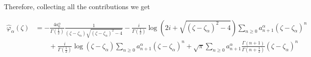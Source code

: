 \documentclass{article}
\begin{document}
Therefore, collecting all the contributions we get

\begin{align*}
\hat{\varphi}_{\alpha}(\zeta)&=-\frac{4a_0^{\alpha}}{\Gamma\left(\tfrac{1}{2}\right)}\frac{1}{(\zeta-\zeta_\alpha)\sqrt{(\zeta-\zeta_{\alpha})^2-4}}-\frac{i}{\Gamma\left(\tfrac{1}{2}\right)}\log(2i+\sqrt{(\zeta-\zeta_\alpha)^2-4})\sum_{n\geq 0}a_{n+1}^{\alpha}(\zeta-\zeta_{\alpha})^{n}\\
&\qquad +\frac{i}{\Gamma\left(\tfrac{1}{2}\right)}\log(\zeta-\zeta_{\alpha})\sum_{n\geq 0}a_{n+1}^{\alpha}(\zeta-\zeta_{\alpha})^{n}+\sqrt{\pi}\sum_{n\geq 0}a_{n+1}^{\alpha}\tfrac{\Gamma(n+1)}{\Gamma(n+\tfrac{1}{2})}(\zeta-\zeta_{\alpha})^{n}
\end{align*}




\end{document}
